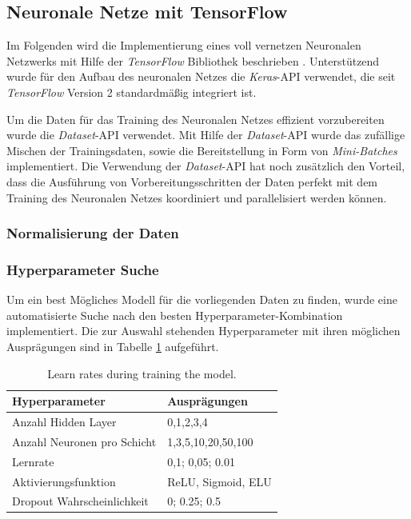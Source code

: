 \subsection{Neuronale Netze mit TensorFlow}
Im Folgenden wird die Implementierung eines voll vernetzen Neuronalen Netzwerks mit Hilfe der \emph{TensorFlow} Bibliothek beschrieben \cite{tensorflow2015-whitepaper}. Unterstützend wurde für den Aufbau des neuronalen Netzes die \emph{Keras}-API verwendet, die seit \emph{TensorFlow} Version 2 standardmäßig integriert ist. 

Um die Daten für das Training des Neuronalen Netzes effizient vorzubereiten wurde die \emph{Dataset}-API verwendet. Mit Hilfe der \emph{Dataset}-API wurde das zufällige Mischen der Trainingsdaten, sowie die Bereitstellung in Form von \emph{Mini-Batches} implementiert. Die Verwendung der \emph{Dataset}-API hat noch zusätzlich den Vorteil, dass die Ausführung von Vorbereitungsschritten der Daten perfekt mit dem Training des Neuronalen Netzes koordiniert und parallelisiert werden können.

\subsubsection{Normalisierung der Daten}

\subsubsection{Hyperparameter Suche}
\label{nn_hyperparams}
Um ein best Mögliches Modell für die vorliegenden Daten zu finden, wurde eine automatisierte Suche nach den besten Hyperparameter-Kombination implementiert. Die zur Auswahl stehenden Hyperparameter mit ihren möglichen Ausprägungen sind in Tabelle \ref{table:hyper} aufgeführt.

\begin{table}[ht]
	\centering
	\begin{tabular}{ll}
		\textbf{Hyperparameter}     & \textbf{Ausprägungen} \\ \hline
		Anzahl Hidden Layer         & 0,1,2,3,4             \\
		Anzahl Neuronen pro Schicht & 1,3,5,10,20,50,100    \\
		Lernrate                    & 0,1;  0,05;  0.01     \\
		Aktivierungsfunktion        & ReLU, Sigmoid, ELU \\
		Dropout Wahrscheinlichkeit  & 0;  0.25;  0.5       
	\end{tabular}
	\caption{\label{table:hyper}Learn rates during training the model.}
\end{table}

